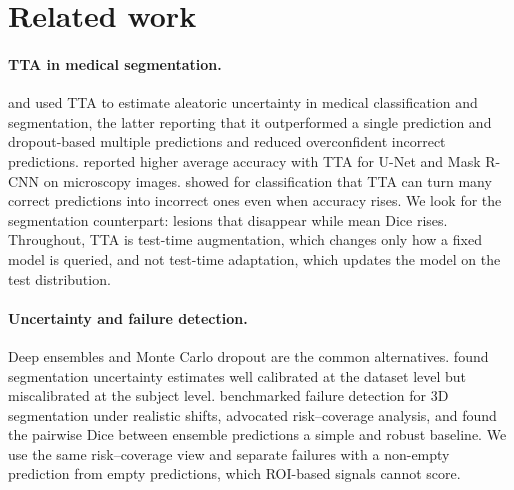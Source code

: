 \section{Related work}
\label{sec:related}

\paragraph{TTA in medical segmentation.} \citet{ayhan2018tta} and \citet{wang2019aleatoric} used TTA to estimate aleatoric uncertainty in medical classification and segmentation, the latter reporting that it outperformed a single prediction and dropout-based multiple predictions and reduced overconfident incorrect predictions. \citet{moshkov2020tta} reported higher average accuracy with TTA for U-Net and Mask R-CNN on microscopy images. \citet{shanmugam2021better} showed for classification that TTA can turn many correct predictions into incorrect ones even when accuracy rises. We look for the segmentation counterpart: lesions that disappear while mean Dice rises. Throughout, TTA is test-time augmentation, which changes only how a fixed model is queried, and not test-time adaptation, which updates the model on the test distribution.

\paragraph{Uncertainty and failure detection.} Deep ensembles \cite{lakshminarayanan2017ensembles} and Monte Carlo dropout \cite{gal2016dropout} are the common alternatives. \citet{jungo2019reliability} found segmentation uncertainty estimates well calibrated at the dataset level but miscalibrated at the subject level. \citet{zenk2025failure} benchmarked failure detection for 3D segmentation under realistic shifts, advocated risk--coverage analysis, and found the pairwise Dice between ensemble predictions a simple and robust baseline. We use the same risk--coverage view and separate failures with a non-empty prediction from empty predictions, which ROI-based signals cannot score.

